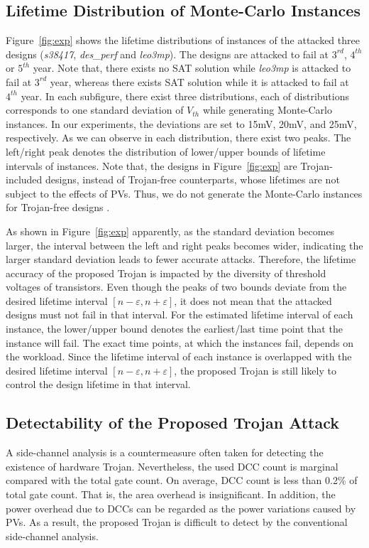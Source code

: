 \subsection{Lifetime Distribution of Monte-Carlo Instances}
\label{sec:exp:exp}
Figure~\ref{fig:exp} shows the lifetime distributions of instances of the attacked three designs (\textit{s38417}, \textit{des\_perf} and \textit{leo3mp}). The designs are attacked to fail at $3^{rd}$, $4^{th}$ or $5^{th}$ year. Note that, there exists no SAT solution while \textit{leo3mp} is attacked to fail at $3^{rd}$ year, whereas there exists SAT solution while it is attacked to fail at $4^{th}$ year. In each subfigure, there exist three distributions, each of distributions corresponds to one standard deviation of $V_{th}$ while generating Monte-Carlo instances. In our experiments, the deviations are set to 15mV, 20mV, and 25mV, respectively. As we can observe in each distribution, there exist two peaks. The left/right peak denotes the distribution of lower/upper bounds of lifetime intervals of instances. Note that, the designs in Figure~\ref{fig:exp} are Trojan-included designs, instead of Trojan-free counterparts, whose lifetimes are not subject to the effects of PVs. Thus, we do not generate the Monte-Carlo instances for Trojan-free designs .

As shown in Figure~\ref{fig:exp} apparently, as the standard deviation becomes larger, the interval between the left and right peaks becomes wider, indicating the larger standard deviation leads to fewer accurate attacks. Therefore, the lifetime accuracy of the proposed Trojan is impacted by the diversity of threshold voltages of transistors. Even though the peaks of two bounds deviate from the desired lifetime interval $[n - \varepsilon, n + \varepsilon]$, it does not mean that the attacked designs must not fail in that interval. For the estimated lifetime interval of each instance, the lower/upper bound denotes the earliest/last time point that the instance will fail. The exact time points, at which the instances fail, depends on the workload. Since the lifetime interval of each instance is overlapped with the desired lifetime interval $[n - \varepsilon, n + \varepsilon]$, the proposed Trojan is still likely to control the design lifetime in that interval.

\subsection{Detectability of the Proposed Trojan Attack}
\label{sec:exp:det}
A side-channel analysis is a countermeasure often taken for detecting the existence of hardware Trojan. Nevertheless, the used DCC count is marginal compared with the total gate count. On average, DCC count is less than 0.2\% of total gate count. That is, the area overhead is insignificant. In addition, the power overhead due to DCCs can be regarded as the power variations caused by PVs. As a result, the proposed Trojan is difficult to detect by the conventional side-channel analysis. 

